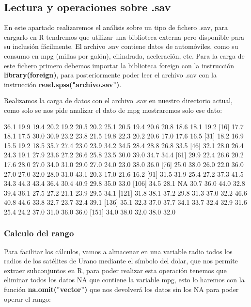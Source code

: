 \documentclass [a4paper] {article}
\begin{document}
\subsection{Lectura y operaciones sobre .sav} 
En este apartado realizaremos el análisis sobre un tipo de fichero .sav, para cargarlo en R tendremos
que utilizar una biblioteca externa pero disponible para su inclusión fácilmente. El archivo .sav contiene datos
de automóviles, como su consumo en mpg (millas por galón), cilindrada, aceleración, etc. Para la carga de este
fichero primero debemos importar la biblioteca foreign con la instrucción \textbf{library(foreign)}, para posteriormente
poder leer el archivo .sav con la instrucción \textbf{read.spss("archivo.sav")}. 

Realizamos la carga de datos con el archivo .sav en nuestro directorio actual, como solo se nos pide analizar el dato de mpg mostraremos solo ese dato:
\begin{Schunk}
\begin{Soutput}
  [1] 36.1 19.9 19.4 20.2 19.2 20.5 20.2 25.1 20.5 19.4 20.6 20.8 18.6 18.1 19.2
 [16] 17.7 18.1 17.5 30.0 30.9 23.2 23.8 21.5 19.8 22.3 20.2 20.6 17.0 17.6 16.5
 [31] 18.2 16.9 15.5 19.2 18.5 35.7 27.4 23.0 23.9 34.2 34.5 28.4 28.8 26.8 33.5
 [46] 32.1 28.0 26.4 24.3 19.1 27.9 23.6 27.2 26.6 25.8 23.5 30.0 39.0 34.7 34.4
 [61] 29.9 22.4 26.6 20.2 17.6 28.0 27.0 34.0 31.0 29.0 27.0 24.0 23.0 38.0 36.0
 [76] 25.0 38.0 26.0 22.0 36.0 27.0 27.0 32.0 28.0 31.0 43.1 20.3 17.0 21.6 16.2
 [91] 31.5 31.9 25.4 27.2 37.3 41.5 34.3 44.3 43.4 36.4 30.4 40.9 29.8 35.0 33.0
[106] 34.5 28.1   NA 30.7 36.0 44.0 32.8 39.4 36.1 27.5 27.2 21.1 23.9 29.5 34.1
[121] 31.8 38.1 37.2 29.8 31.3 37.0 32.2 46.6 40.8 44.6 33.8 32.7 23.7 32.4 39.1
[136] 35.1 32.3 37.0 37.7 34.1 33.7 32.4 32.9 31.6 25.4 24.2 37.0 31.0 36.0 36.0
[151] 34.0 38.0 32.0 38.0 32.0
\end{Soutput}
\end{Schunk}

\subsubsection{Calculo del rango}
Para facilitar los cálculos, vamos a almacenar en una variable radio todos los radios de los satélites de Urano mediante el símbolo del dolar,  
que nos permite extraer subconjuntos en R, para poder realizar esta operación tenemos que eliminar todos los datos NA que contiene la variable mpg,
esto lo haremos con la función \textbf{na.omit("vector")} que nos devolverá los datos sin los NA para poder operar el rango:
\end{document}
